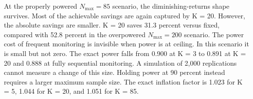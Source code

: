 \documentclass[
  11pt,
]{article}
\begin{document}
\begin{table}[!h]
\centering
\caption{\label{tab:hf-table-90pow}Operating characteristics across monitoring frequencies at $\delta = 0.5$, $N_{\max} = 85$ per arm (fixed design at approximately 90\% power). Each simulated power lies within two Monte Carlo SEs of its exact value in Table \\ref{tab:exact-table}. The simulation does not resolve the differences in power across K. The percent-saved curve is smaller in absolute terms at every K than in the overpowered table.}
\centering
{}
\end{table}

At the properly powered \(N_{\max} = 85\)
scenario, the diminishing-returns shape survives. Most
of the achievable savings are again captured by K = 20.
However, the absolute savings are smaller. K = 20 saves
31.3
percent versus fixed, compared with
52.8
percent in the overpowered \(N_{\max} = 200\) scenario.
The power cost of frequent monitoring is invisible when
power is at ceiling. In this scenario it is small but
not zero. The exact power falls from
0.900 at K = 3 to
0.891 at K = 20 and
0.888 at fully
sequential monitoring. A simulation of 2,000
replications cannot measure a change of this size.
Holding power at 90 percent instead requires a larger
maximum sample size. The exact inflation factor is
1.023 for K = 5,
1.044 for K = 20, and
1.051 for K =
85.
\end{document}
